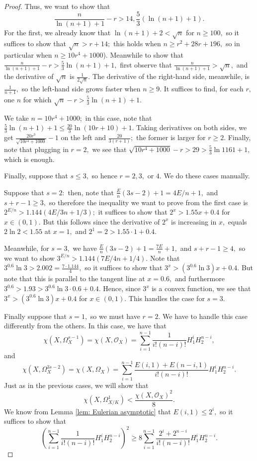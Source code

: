 \documentclass{article}
\theoremstyle{definition}
\theoremstyle{remark}
\begin{document}
\begin{proof}
\par Thus, we want to show that \[\frac{n}{\ln (n+1) + 1} - r > 14, \frac{5}{3} \left(\ln(n+1) + 1\right).\] For the first, we already know that $\ln(n+1) + 2 < \sqrt{n}$ for $n \geq 100,$ so it suffices to show that $\sqrt{n} > r + 14;$ this holds when $n \geq r^2 + 28r + 196,$ so in particular when $n \geq 10r^4 + 1000$). Meanwhile to show that $\frac{n}{\ln (n+1) + 1} - r > \frac{5}{3} \ln(n+1) + 1,$ first observe that $\frac{n}{\ln (n+1) + 1} > \sqrt{n},$ and the derivative of $\sqrt{n}$ is $\frac{1}{2\sqrt{n}}.$ The derivative of the right-hand side, meanwhile, is $\frac{1}{n+1},$ so the left-hand side grows faster when $n \geq 9.$ It suffices to find, for each $r,$ one $n$ for which $\sqrt{n} - r > \frac{5}{3} \ln(n+1) + 1.$
\par We take $n = 10r^4 + 1000;$ in this case, note that $\frac{5}{3}\ln (n+1) + 1 \leq \frac{20}{3}\ln (10r+10) + 1.$ Taking derivatives on both sides, we get $\frac{20r^3}{\sqrt{10r^4 + 1000}} - 1$ on the left and $\frac{20}{3(r+1)};$ the former is larger for $r \geq 2.$ Finally, note that plugging in $r = 2,$ we see that $\sqrt{10r^4 + 1000} - r > 29 > \frac{5}{3} \ln 1161 + 1,$ which is enough.
\par Finally, suppose that $s \leq 3,$ so hence $r = 2, 3,$ or $4.$ We do these cases manually.
\par Suppose that $s = 2:$ then, note that $\frac{E}{n}(3s - 2) + 1 = 4E/n + 1,$ and $s + r - 1 \geq 3,$ so therefore the inequality we want to prove from the first case is $2^{E/n} > 1.144(4E/3n + 1/3);$ it suffices to show that $2^x > 1.55x + 0.4$ for $x \in (0, 1).$ But this follows since the derivative of $2^x$ is increasing in $x,$ equals $2 \ln 2 < 1.55$ at $x = 1,$ and $2^1 = 2 > 1.55\cdot 1 + 0.4.$
\par Meanwhile, for $s = 3,$ we have $\frac{E}{n}(3s - 2) + 1 = \frac{7E}{n} + 1,$ and $s + r - 1 \geq 4,$ so we want to show $3^{E/n} > 1.144(7E/4n + 1/4).$ Note that $3^{0.6}\ln 3 > 2.002 = \frac{7\cdot 1.144}{4},$ so it suffices to show that $3^x > (3^{0.6} \ln 3)x + 0.4.$ But note that this is parallel to the tangent line at $x = 0.6,$ and furthermore $3^{0.6} > 1.93 > 3^{0.6} \ln 3 \cdot 0.6 + 0.4.$ Hence, since $3^x$ is a convex function, we see that $3^x > (3^{0.6} \ln 3)x + 0.4$ for $x \in (0, 1).$ This handles the case for $s = 3.$
\par Finally suppose that $s = 1,$ so we must have $r = 2.$ We have to handle this case differently from the others. In this case, we have that \[\chi(X, \Omega^{s-1}_X) = \chi(X, \mathcal{O}_X) = \sum\limits_{i=1}^{n-1} \frac{1}{i!(n-i)!}H_1^iH_2^{n-i},\] and \[\chi(X, \Omega^{3s-2}_X) = \chi(X, \Omega_X) = \sum\limits_{i=1}^{n-1} \frac{E(i, 1) + E(n-i, 1)}{i!(n-i)!}H_1^iH_2^{n-i}.\] Just as in the previous cases, we will show that \[\chi(X, \Omega_{X/K}^1) < \frac{\chi(X, \mathcal{O}_X)^2}{8}.\] We know from Lemma \ref{lem: Eulerian asymptotic} that $E(i, 1) \leq 2^i,$ so it suffices to show that \[\left(\sum\limits_{i=1}^{n-1} \frac{1}{i!(n-i)!}H_1^iH_2^{n-i}\right)^2 \geq 8 \sum\limits_{i=1}^{n-1} \frac{2^i + 2^{n-i}}{i!(n-i)!}H_1^iH_2^{n-i}.\]

\end{proof}
\end{document}

